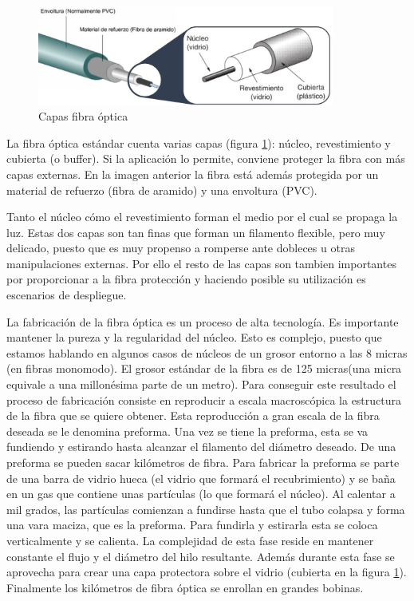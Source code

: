   \begin{figure}[H]
  	\centering
  	\includegraphics[width=0.87\textwidth]{./img/capas-fibra2}
  	\caption{Capas fibra óptica \cite{imgNucleoFibra,imgCapasFO}} 
  	\label{fig:capasFibra}
  \end{figure} 
  
  
  
 La fibra óptica estándar cuenta varias capas (figura \ref{fig:capasFibra}): núcleo, revestimiento y cubierta (o buffer).  Si la aplicación lo permite, conviene proteger la fibra con más capas externas. En la imagen anterior la fibra está además protegida por un material de refuerzo (fibra de aramido) y una envoltura (PVC).
 
 Tanto el núcleo cómo el revestimiento forman el medio por el cual se propaga la luz. Estas dos capas son tan finas que forman un filamento flexible, pero muy delicado, puesto que es muy propenso a romperse ante dobleces u otras manipulaciones externas. Por ello el resto de las capas son tambien importantes por proporcionar a la fibra protección y haciendo posible su utilización es escenarios de despliegue.
 
 La fabricación de la fibra óptica es un proceso de alta tecnología. Es importante mantener la pureza y la regularidad del núcleo. Esto es complejo, puesto que estamos hablando en algunos casos de núcleos de un grosor entorno a las 8 micras (en fibras monomodo). El grosor estándar de la fibra es de 125 micras(una micra equivale a una millonésima parte de un metro). Para conseguir este resultado el proceso de fabricación consiste en reproducir a escala macroscópica la estructura de la fibra que se quiere obtener. Esta reproducción a gran escala de la fibra deseada se le denomina preforma. Una vez se tiene la preforma, esta se va fundiendo y estirando hasta alcanzar el filamento del diámetro deseado. De una preforma se pueden sacar kilómetros de fibra. Para fabricar la preforma se parte de una barra de vidrio hueca (el vidrio que formará el recubrimiento) y se baña en un gas que contiene unas partículas (lo que formará el núcleo). Al calentar a mil grados, las partículas comienzan a fundirse hasta que el tubo colapsa y forma una vara maciza, que es la preforma. Para fundirla y estirarla esta se coloca verticalmente y se calienta. La complejidad de esta fase reside en mantener constante el flujo y el diámetro del hilo resultante. Además durante esta fase se aprovecha para crear una capa protectora sobre el vidrio (cubierta en la figura \ref{fig:capasFibra}). Finalmente los kilómetros de fibra óptica se enrollan en grandes bobinas. \cite{fabricacionFO}
 
